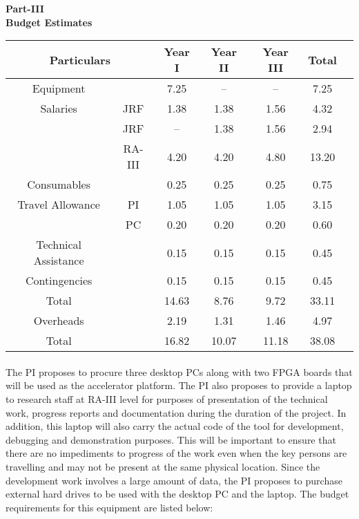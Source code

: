 \documentclass[12pt]{article}
\begin{document}
\newpage

\begin{center} {\bf \large Part-III\\
\vspace{2ex}
Budget Estimates}
\end{center}

\incten


\begin{center}
\begin{tabular}{|c|c|c|c|c|c|c|}
\hline
\multicolumn{2}{|c|}{Particulars} & Year I & Year II & Year III & Total \\
\hline
\hline
Equipment &  & 7.25 & -- & -- & 7.25 \\
Salaries & JRF & 1.38 & 1.38 & 1.56 & 4.32 \\
 & JRF & -- & 1.38 & 1.56 & 2.94 \\
 & RA-III & 4.20 & 4.20 & 4.80 & 13.20 \\
Consumables &  & 0.25 & 0.25 & 0.25 & 0.75 \\
Travel Allowance & PI & 1.05 & 1.05 & 1.05 & 3.15 \\
 & PC & 0.20 & 0.20 & 0.20 & 0.60 \\
Technical Assistance &  & 0.15 & 0.15 & 0.15 & 0.45 \\
Contingencies &  & 0.15 & 0.15 & 0.15 & 0.45 \\
\hline
Total &  & 14.63 & 8.76 & 9.72 & 33.11 \\
\hline 
Overheads &  & 2.19 & 1.31 & 1.46 & 4.97\\
\hline
Total &  & 16.82 & 10.07 & 11.18 & 38.08\\
\hline
\end{tabular}
\end{center}


\paragraph{} The PI proposes to procure three desktop PCs along with
two FPGA boards that will be used as the accelerator platform. The PI
also proposes to provide a laptop to research staff at RA-III level
for purposes of presentation of the technical work, progress reports
and documentation during the duration of the project. In addition,
this laptop will also carry the actual code of the tool for
development, debugging and demonstration purposes. This will be
important to ensure that there are no impediments to progress of the
work even when the key persons are travelling and may not be present
at the same physical location. Since the development work involves a
large amount of data, the PI proposes to purchase external hard drives
to be used with the desktop PC and the laptop. The budget requirements
for this equipment are listed below:
\end{document}
